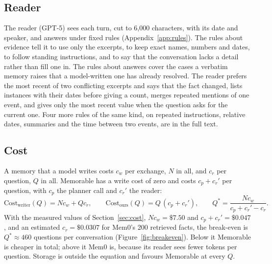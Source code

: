 \subsection{Reader}
\label{sec:reader}
The reader (GPT-5) sees each turn, cut to 6,000 characters, with its date and speaker, and answers under fixed rules (Appendix~\ref{app:rules}). The rules about evidence tell it to use only the excerpts, to keep exact names, numbers and dates, to follow standing instructions, and to say that the conversation lacks a detail rather than fill one in. The rules about answers cover the cases a verbatim memory raises that a model-written one has already resolved. The reader prefers the most recent of two conflicting excerpts and says that the fact changed, lists instances with their dates before giving a count, merges repeated mentions of one event, and gives only the most recent value when the question asks for the current one. Four more rules of the same kind, on repeated instructions, relative dates, summaries and the time between two events, are in the full text.

\subsection{Cost}
\label{sec:costmodel}
A memory that a model writes costs $c_w$ per exchange, $N$ in all, and $c_r$ per question, $Q$ in all. Memorable has a write cost of zero and costs $c_p + c_r'$ per question, with $c_p$ the planner call and $c_r'$ the reader:
\begin{equation}
\mathrm{Cost}_{\text{writer}}(Q) = N c_w + Q c_r, \qquad \mathrm{Cost}_{\text{ours}}(Q) = Q\,(c_p + c_r'), \qquad Q^{*} = \frac{N c_w}{c_p + c_r' - c_r} .
\label{eq:cost}
\end{equation}
With the measured values of Section~\ref{sec:cost}, $N c_w = \$7.50$ and $c_p + c_r' = \$0.047$, and an estimated $c_r = \$0.0307$ for Mem0's 200 retrieved facts, the break-even is $Q^{*} \approx 460$ questions per conversation (Figure~\ref{fig:breakeven}). Below it Memorable is cheaper in total; above it Mem0 is, because its reader sees fewer tokens per question. Storage is outside the equation and favours Memorable at every $Q$.
